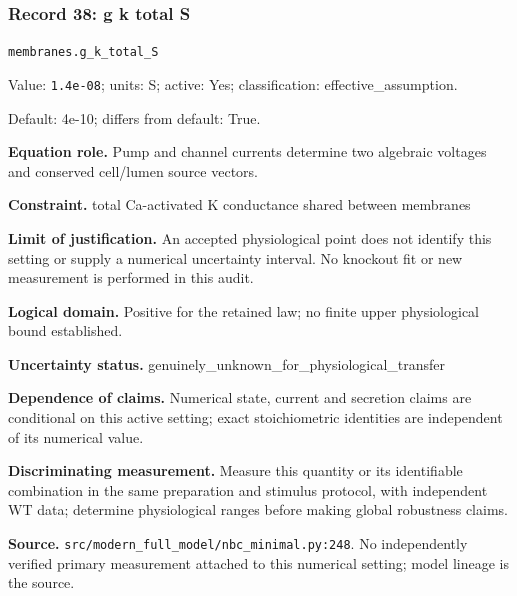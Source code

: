 \subsubsection*{Record 38: g k total S}
{\small \nolinkurl{membranes.g_k_total_S}\par

Value: \texttt{1.4e-08}; units: S; active: Yes; classification: effective\_assumption.\par

Default: 4e-10; differs from default: True.\par

\textbf{Equation role.} Pump and channel currents determine two algebraic voltages and conserved cell/lumen source vectors.\par

\textbf{Constraint.} total Ca-activated K conductance shared between membranes\par

\textbf{Limit of justification.} An accepted physiological point does not identify this setting or supply a numerical uncertainty interval. No knockout fit or new measurement is performed in this audit.\par

\textbf{Logical domain.} Positive for the retained law; no finite upper physiological bound established.\par

\textbf{Uncertainty status.} genuinely\_unknown\_for\_physiological\_transfer\par

\textbf{Dependence of claims.} Numerical state, current and secretion claims are conditional on this active setting; exact stoichiometric identities are independent of its numerical value.\par

\textbf{Discriminating measurement.} Measure this quantity or its identifiable combination in the same preparation and stimulus protocol, with independent WT data; determine physiological ranges before making global robustness claims.\par

\textbf{Source.} \nolinkurl{src/modern_full_model/nbc_minimal.py:248}. No independently verified primary measurement attached to this numerical setting; model lineage is the source.\par}

